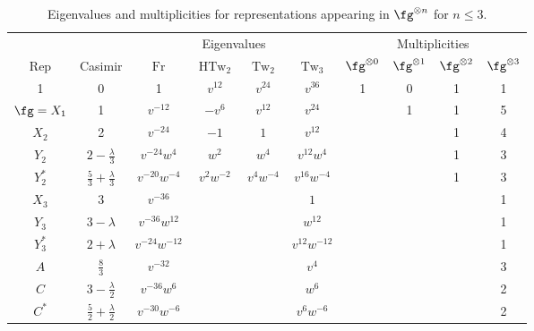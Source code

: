 \documentclass[12pt]{amsart}
\DeclareMathOperator{\Tw}{Tw}
\DeclareMathOperator{\HTw}{HTw}
\DeclareMathOperator{\Fr}{Fr}
\begin{document}
\begin{table}
  \centering
\medskip
\begin{tabular}{cccccccccc}
  \toprule
      &         &   \multicolumn{4}{c}{Eigenvalues}    & \multicolumn{4}{c}{Multiplicities} \\
  \cmidrule(lr){3-6} \cmidrule(l){7-10}
  Rep & Casimir & $\Fr$ & $\HTw_2$ & $\Tw_2$ & $\Tw_3$ & $\fg^{\otimes0}$ & $\fg^{\otimes1}$ & $\fg^{\otimes2}$ & $\fg^{\otimes3}$\\ \midrule
  1   & 0       & 1     & $v^{12}$ & $v^{24}$ & $v^{36}$
      & 1 & 0 & 1 & 1\\[3pt]
  $\fg=X_1$ & 1 & $v^{-12}$ & $-v^6$ & $v^{12}$ & $v^{24}$
      &   & 1 & 1 & 5\\[3pt]
  $X_2$ & 2     & $v^{-24}$ & $-1$ & $1$      & $v^{12}$
      &   &   & 1 & 4\\[3pt]
  $Y_2$ & $2 - \frac{\lambda}{3}$ & $v^{-24}w^4$ & $w^2$ & $w^4$ & $v^{12}w^4$
      &   &   & 1 & 3\\[3pt]
  $Y_2^*$ & $\frac{5}{3} + \frac{\lambda}{3}$ & $v^{-20}w^{-4}$ & $v^2 w^{-2}$ & $v^4 w^{-4}$ & $v^{16}w^{-4}$
      &   &   & 1 & 3\\[3pt]
  $X_3$ & $3$ & $v^{-36}$ & & & $1$ &&&& 1\\[3pt]
  $Y_3$ & $3 - \lambda$ & $v^{-36}w^{12}$ &&& $w^{12}$ &&&& 1\\[3pt]
  $Y_3^*$ & $2 + \lambda$ & $v^{-24}w^{-12}$ &&& $v^{12}w^{-12}$ &&&& 1\\[3pt]
  $A$ & $\frac{8}{3}$ & $v^{-32}$ &&& $v^4$ &&&& 3\\[3pt]
  $C$ & $3 - \frac{\lambda}{2}$ & $v^{-36}w^6$ &&& $w^6$ &&&& 2\\[3pt]
  $C^*$ & $\frac{5}{2} + \frac{\lambda}{2}$ & $v^{-30}w^{-6}$ &&& $v^6w^{-6}$ &&&& 2\\[3pt]
  \bottomrule
\end{tabular}
\medskip
\caption{Eigenvalues and multiplicities for representations appearing in $\fg^{\otimes n}$ for $n \le 3$.}
\label{tab:e-vals}
\end{table}
\end{document}
